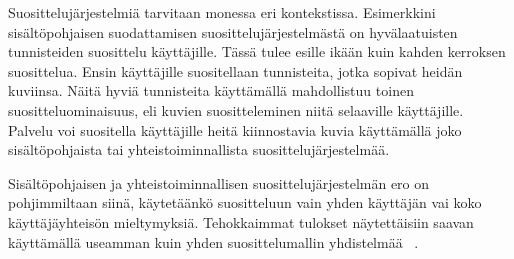 \documentclass[12pt,finnish]{tktltiki2}
\theoremstyle{definition}
\theoremstyle{remark}
\begin{document}
Suosittelujärjestelmiä tarvitaan monessa eri kontekstissa. Esimerkkini sisältöpohjaisen suodattamisen suosittelujärjestelmästä on hyvälaatuisten tunnisteiden suosittelu käyttäjille. Tässä tulee esille ikään kuin kahden kerroksen suosittelua. Ensin käyttäjille suositellaan tunnisteita, jotka sopivat heidän kuviinsa. Näitä hyviä tunnisteita käyttämällä mahdollistuu toinen suositteluominaisuus, eli kuvien suositteleminen niitä selaaville käyttäjille. Palvelu voi suositella käyttäjille heitä kiinnostavia kuvia käyttämällä joko sisältöpohjaista tai yhteistoiminnallista suosittelujärjestelmää.

Sisältöpohjaisen ja yhteistoiminnallisen suosittelujärjestelmän ero on pohjimmiltaan siinä, käytetäänkö suositteluun vain yhden käyttäjän vai koko käyttäjäyhteisön mieltymyksiä. Tehokkaimmat tulokset näytettäisiin saavan käyttämällä useamman kuin yhden suosittelumallin yhdistelmää ~\cite{Bell:2007:LNP:1345448.1345465}.





%
%
% 
%







 
\end{document}
